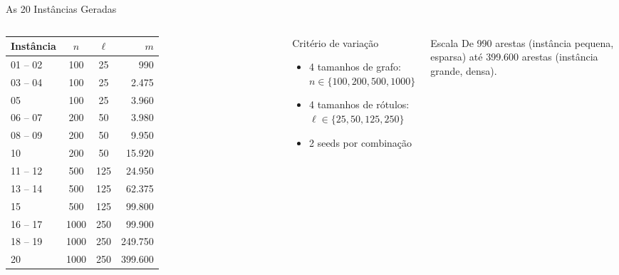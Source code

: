 \documentclass{beamer}
\begin{document}

\begin{frame}{As 20 Instâncias Geradas}

\begin{columns}[T]


\begin{table}[h]
\centering
\renewcommand{\arraystretch}{1.15}
\footnotesize
\begin{tabular}{lccr}
\toprule
\textbf{Instância} & $n$ & $\ell$ & $m$ \\
\midrule
01 -- 02 & 100  & 25  & 990     \\
03 -- 04 & 100  & 25  & 2.475   \\
05       & 100  & 25  & 3.960   \\
\midrule
06 -- 07 & 200  & 50  & 3.980   \\
08 -- 09 & 200  & 50  & 9.950   \\
10       & 200  & 50  & 15.920  \\
\midrule
11 -- 12 & 500  & 125 & 24.950  \\
13 -- 14 & 500  & 125 & 62.375  \\
15       & 500  & 125 & 99.800  \\
\midrule
16 -- 17 & 1000 & 250 & 99.900  \\
18 -- 19 & 1000 & 250 & 249.750 \\
20       & 1000 & 250 & 399.600 \\
\bottomrule
\end{tabular}
\end{table}


    \begin{block}{Critério de variação}
        \begin{itemize}
            \item 4 tamanhos de grafo: \\ $n \in \{100, 200, 500, 1000\}$
            \item 4 tamanhos de rótulos: \\ $\ell \in \{25, 50, 125, 250\}$
            \item 2 seeds por combinação
        \end{itemize}
    \end{block}

    \vspace{0.2cm}

    \begin{exampleblock}{Escala}
        De 990 arestas (instância pequena, esparsa) até 399.600 arestas (instância grande, densa).
    \end{exampleblock}

\end{columns}

\end{frame}
\end{document}
